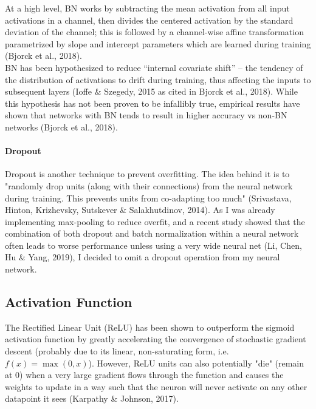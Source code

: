 \documentclass[11pt]{article}
\begin{document}
At a high level, BN works by subtracting the mean activation from all
input activations in a channel, then divides the centered activation by
the standard deviation of the channel; this is followed by a
channel-wise affine transformation parametrized by slope and intercept
parameters which are learned during training (Bjorck et al., 2018).\\

BN has been hypothesized to reduce ``internal covariate shift'' -- the
tendency of the distribution of activations to drift during training,
thus affecting the inputs to subsequent layers (Ioffe \& Szegedy, 2015
as cited in Bjorck et al., 2018). While this hypothesis has not been
proven to be infallibly true, empirical results have shown that networks
with BN tends to result in higher accuracy vs non-BN networks (Bjorck et
al., 2018).

\paragraph{Dropout}\label{dropout}

Dropout is another technique to prevent overfitting. The idea behind it
is to "randomly drop units (along with their connections) from the
neural network during training. This prevents units from co-adapting too
much" (Srivastava, Hinton, Krizhevsky, Sutskever \& Salakhutdinov,
2014). As I was already implementing max-pooling to reduce overfit, and
a recent study showed that the combination of both dropout and batch
normalization within a neural network often leads to worse performance
unless using a very wide neural net (Li, Chen, Hu \& Yang, 2019), I
decided to omit a dropout operation from my neural network.

\subsection{Activation Function}\label{activation-function}

The Rectified Linear Unit (ReLU) has been shown to outperform the
sigmoid activation function by greatly accelerating the convergence of
stochastic gradient descent (probably due to its linear, non-saturating
form, i.e. \(f(x)=\max(0,x)\)). However, ReLU units can also potentially
"die" (remain at 0) when a very large gradient flows through the
function and causes the weights to update in a way such that the neuron
will never activate on any other datapoint it sees (Karpathy \& Johnson,
2017).\\
\end{document}
